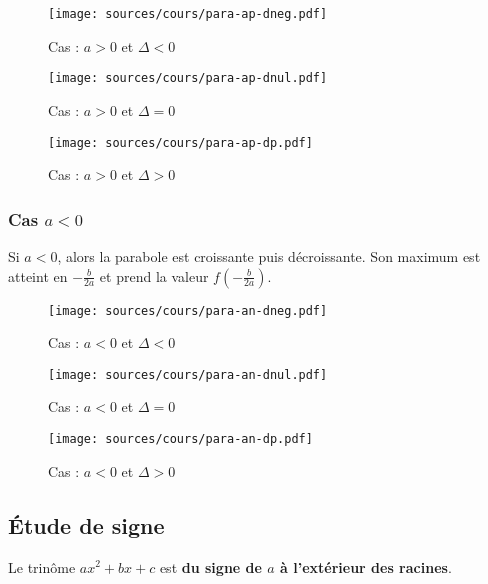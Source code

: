 \documentclass[paper=a4, fontsize=9pt]{scrartcl} %
\begin{document}
\begin{multicols}{3}
  \begin{figure}[H]
    \centering
    \texttt{[image: sources/cours/para-ap-dneg.pdf]}
    \caption*{Cas : $a > 0$ et $\Delta < 0$}
  \end{figure}

  \begin{figure}[H]
    \centering
    \texttt{[image: sources/cours/para-ap-dnul.pdf]}
    \caption*{Cas : $a > 0$ et $\Delta = 0$}
  \end{figure}

  \begin{figure}[H]
    \centering
    \texttt{[image: sources/cours/para-ap-dp.pdf]}
    \caption*{Cas : $a > 0$ et $\Delta > 0$}
  \end{figure}
\end{multicols}

\subsubsection{Cas $a < 0$}
Si $a < 0$, alors la parabole est croissante puis décroissante. Son maximum est atteint  en $-\frac{b}{2a}$ et prend la valeur $f( -\frac{b}{2a} )$.

\begin{multicols}{3}
  \begin{figure}[H]
    \centering
    \texttt{[image: sources/cours/para-an-dneg.pdf]}
    \caption*{Cas : $a < 0$ et $\Delta < 0$}
  \end{figure}

  \begin{figure}[H]
    \centering
    \texttt{[image: sources/cours/para-an-dnul.pdf]}
    \caption*{Cas : $a < 0$ et $\Delta = 0$}
  \end{figure}

  \begin{figure}[H]
    \centering
    \texttt{[image: sources/cours/para-an-dp.pdf]}
    \caption*{Cas : $a < 0$ et $\Delta > 0$}
  \end{figure}
\end{multicols}

\subsection{Étude de signe}
Le trinôme $ax^2 + bx + c$ est \textbf{du signe de $a$ à l'extérieur des racines}.
\end{document}
